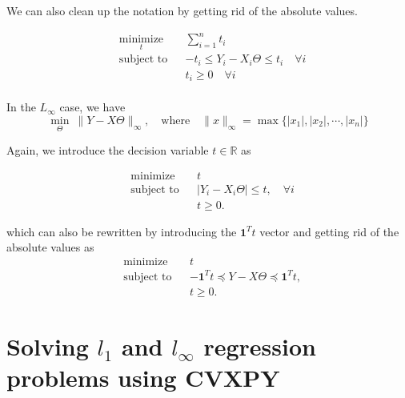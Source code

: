 \documentclass{article}
\begin{document}
We can also clean up the notation by getting rid of the absolute values.

\begin{equation*}
\begin{aligned}
& \underset{t}{\text{minimize}}
& & \sum_{i=1}^n t_i \\
& \text{subject to}
& & -t_i \leq Y_i - X_i \Theta \leq t_i \quad \forall i\\
&&& t_i \geq 0  \quad \forall i  \\
\end{aligned}
\end{equation*}




In the $L_\infty$ case, we have 
$$ \min_\Theta  \  \lVert Y - X \Theta \rVert_\infty , \quad \text{where} \quad \lVert x \rVert _\infty  = \max \{ |x_1|, |x_2|,\cdots , |x_n| \} $$

Again, we introduce the decision variable $t \in \mathbb{R}$ as 

\begin{equation*}
\begin{aligned}
& {\text{minimize}}
& & t \\
& \text{subject to}
& & | Y_i - X_i \Theta | \leq t, \quad \forall i \\
&&& t \geq 0.
\end{aligned}
\end{equation*}


which can also be rewritten by introducing the $\textbf{1}^T t$ vector and getting rid of the absolute values as 
\begin{equation*}
\begin{aligned}
& {\text{minimize}}
& & t \\
& \text{subject to}
& & -\textbf{1}^T t \preccurlyeq Y - X\Theta  \preccurlyeq \textbf{1}^T t,  \\
&&& t \geq 0.
\end{aligned}
\end{equation*}






\section*{Solving $l_1$ and $l_\infty $ regression problems using CVXPY}
\end{document}
